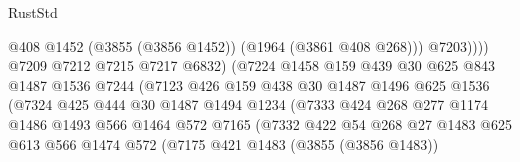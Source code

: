 \begin{lexlean}{RustStd}
\begin{coremodule}
                                          @408
                                          @1452
                                          (@3855 (@3856 @1452))
                                          (@1964 (@3861 @408 @268)))
                                        @7203))))
                                @7209
                                @7212
                                @7215
                                @7217
                                @6832)
                              (@7224
                                @1458
                                @159
                                @439
                                @30
                                @625
                                @843
                                @1487
                                @1536
                                @7244
                                (@7123
                                  @426
                                  @159
                                  @438
                                  @30
                                  @1487
                                  @1496
                                  @625
                                  @1536
                                  (@7324
                                    @425
                                    @444
                                    @30
                                    @1487
                                    @1494
                                    @1234
                                    (@7333
                                      @424
                                      @268
                                      @277
                                      @1174
                                      @1486
                                      @1493
                                      @566
                                      @1464
                                      @572
                                      @7165
                                      (@7332
                                        @422
                                        @54
                                        @268
                                        @27
                                        @1483
                                        @625
                                        @613
                                        @566
                                        @1474
                                        @572
                                        (@7175
                                          @421
                                          @1483
                                          (@3855 (@3856 @1483))

\end{coremodule}
\end{lexlean}
